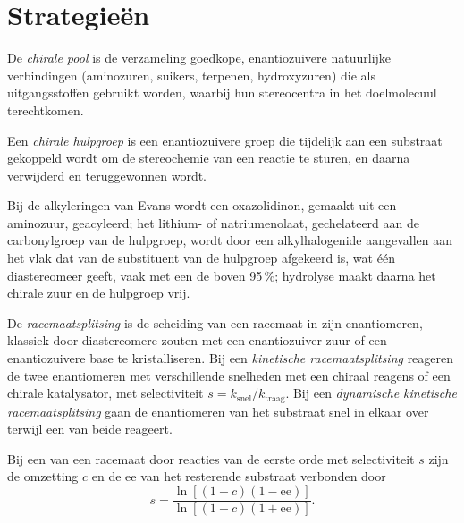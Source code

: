 \section{Strategieën}

\begin{definition}\label{def:b3:asymmetric-synthesis:chiral-pool}
De \emph{chirale pool} is de verzameling goedkope,
enantiozuivere natuurlijke verbindingen (aminozuren, suikers, terpenen,
hydroxyzuren) die als uitgangsstoffen gebruikt worden, waarbij hun
stereocentra in het doelmolecuul terechtkomen.
\end{definition}

\begin{definition}\label{def:b3:asymmetric-synthesis:auxiliary}
Een \emph{chirale hulpgroep} is een enantiozuivere
groep die tijdelijk aan een substraat gekoppeld wordt om de stereochemie
van een reactie te sturen, en daarna verwijderd en teruggewonnen wordt.
\end{definition}

Bij de alkyleringen van Evans wordt een oxazolidinon, gemaakt uit een
aminozuur, geacyleerd; het lithium- of natriumenolaat, gechelateerd aan
de carbonylgroep van de hulpgroep, wordt door een alkylhalogenide
aangevallen aan het vlak dat van de substituent van de hulpgroep
afgekeerd is, wat één diastereomeer geeft, vaak met een de boven
95\,\%; hydrolyse maakt daarna het chirale zuur en de hulpgroep vrij.

\begin{definition}[Racemaatsplitsingen]\label{def:b3:asymmetric-synthesis:resolution}
De \emph{racemaatsplitsing} is de scheiding van
een racemaat in zijn enantiomeren, klassiek door diastereomere zouten met
een enantiozuiver zuur of een enantiozuivere base te kristalliseren. Bij
een \emph{kinetische racemaatsplitsing}
reageren de twee enantiomeren met verschillende snelheden met een chiraal
reagens of een chirale katalysator, met selectiviteit $s = k_{\mathrm{snel}}/k_{\mathrm{traag}}$. Bij een
\emph{dynamische kinetische
racemaatsplitsing} gaan de
enantiomeren van het substraat snel in elkaar over terwijl een van beide
reageert.
\end{definition}

\begin{theorem}\label{thm:b3:asymmetric-synthesis:kagan}
Bij een  van een racemaat door reacties van de eerste orde met selectiviteit $s$
zijn de omzetting $c$ en de ee van het resterende substraat verbonden door
\[
  s = \frac{\ln[(1 - c)(1 - \mathrm{ee})]}{\ln[(1 - c)(1 + \mathrm{ee})]}.
\]
\end{theorem}

